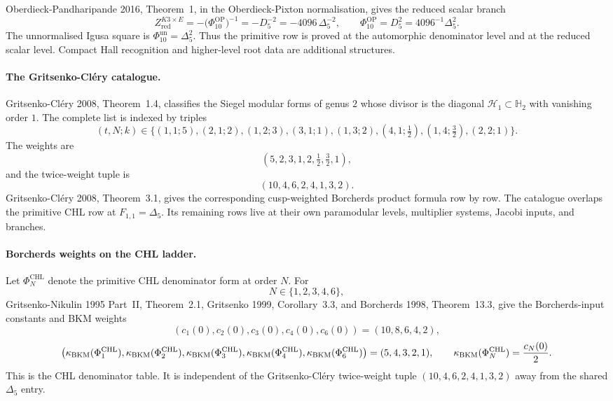 Oberdieck-Pandharipande 2016, Theorem~1, in the Oberdieck-Pixton
normalisation, gives the reduced scalar branch
\[
  Z^{K3\times E}_{\mathrm{red}}
  =-\bigl(\Phi_{10}^{\mathrm{OP}}\bigr)^{-1}
  =-D_5^{-2}
  =-4096\,\Delta_5^{-2},
  \qquad
  \Phi_{10}^{\mathrm{OP}}=D_5^2=4096^{-1}\Delta_5^2.
\]
The unnormalised Igusa square is $\Phi_{10}^{\mathrm{un}}=\Delta_5^2$.
Thus the primitive row is proved at the automorphic denominator level
and at the reduced scalar level. Compact Hall recognition and
higher-level root data are additional structures.

\paragraph{The Gritsenko-Cl\'ery catalogue.}
Gritsenko-Cl\'ery 2008, Theorem~1.4, classifies the Siegel modular
forms of genus $2$ whose divisor is the diagonal
$\mathcal H_1\subset\mathbb H_2$ with vanishing order $1$. The complete
list is indexed by triples
\[
 (t,N;k)\in
 \bigl\{(1,1;5),(2,1;2),(1,2;3),(3,1;1),(1,3;2),
 (4,1;\tfrac12),(1,4;\tfrac32),(2,2;1)\bigr\}.
\]
The weights are
\[
  (5,2,3,1,2,\tfrac12,\tfrac32,1),
\]
and the twice-weight tuple is
\[
  (10,4,6,2,4,1,3,2).
\]
Gritsenko-Cl\'ery 2008, Theorem~3.1, gives the corresponding
cusp-weighted Borcherds product formula row by row. The catalogue
overlaps the primitive CHL row at $F_{1,1}=\Delta_5$. Its remaining
rows live at their own paramodular levels, multiplier systems, Jacobi
inputs, and branches.

\paragraph{Borcherds weights on the CHL ladder.}
Let $\Phi_N^{\mathrm{CHL}}$ denote the primitive CHL denominator form at
order $N$. For
\[
  N\in\{1,2,3,4,6\},
\]
Gritsenko-Nikulin 1995 Part~II, Theorem~2.1, Gritsenko 1999,
Corollary~3.3, and Borcherds 1998, Theorem~13.3, give the
Borcherds-input constants and BKM weights
\[
  (c_1(0),c_2(0),c_3(0),c_4(0),c_6(0))
  =(10,8,6,4,2),
\]
\[
  \bigl(\kappa_{\mathrm{BKM}}(\Phi_1^{\mathrm{CHL}}),\kappa_{\mathrm{BKM}}(\Phi_2^{\mathrm{CHL}}),
  \kappa_{\mathrm{BKM}}(\Phi_3^{\mathrm{CHL}}),\kappa_{\mathrm{BKM}}(\Phi_4^{\mathrm{CHL}}),
  \kappa_{\mathrm{BKM}}(\Phi_6^{\mathrm{CHL}})\bigr)
  =(5,4,3,2,1),
  \qquad
  \kappa_{\mathrm{BKM}}(\Phi_N^{\mathrm{CHL}})=\frac{c_N(0)}{2}.
\]
This is the CHL denominator table. It is independent of the
Gritsenko-Cl\'ery twice-weight tuple
$(10,4,6,2,4,1,3,2)$ away from the shared $\Delta_5$ entry.

